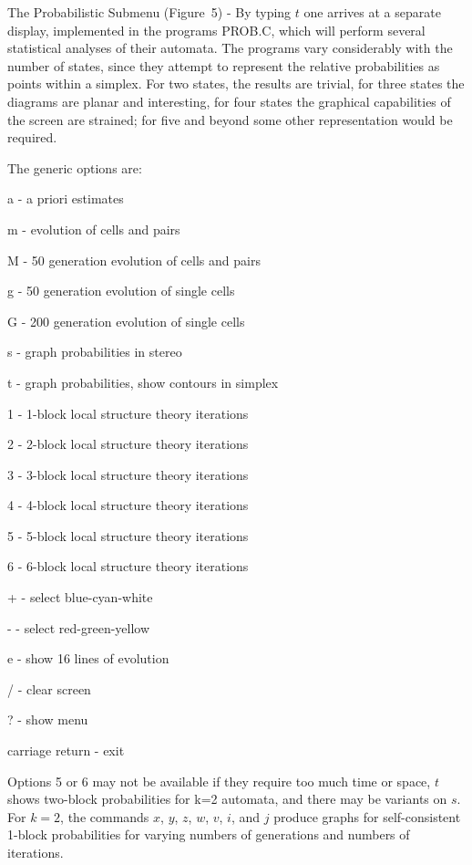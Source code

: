 \begin{list}{}{}
\item[The Probabilistic Submenu (Figure~5)] - By typing $t$ one arrives 
at a separate display, implemented in the programs PROB.C, which will 
perform several statistical analyses of their automata. The programs 
vary considerably with the number of states, since they attempt to 
represent the relative probabilities as points within a simplex. For 
two states, the results are trivial, for three states the diagrams are 
planar and interesting, for four states the graphical capabilities of 
the screen are strained; for five and beyond some other representation 
would be required. 

The generic options are: 

\begin{list}{}{}
\item[a] - a priori estimates 
\item[m] - evolution of cells and pairs 
\item[M] - 50 generation evolution of cells and pairs 
\item[g] - 50 generation evolution of single cells
\item[G] - 200 generation evolution of single cells
\item[s] - graph probabilities in stereo 
\item[t] - graph probabilities, show contours in simplex 
\item[1] - 1-block local structure theory iterations 
\item[2] - 2-block local structure theory iterations 
\item[3] - 3-block local structure theory iterations 
\item[4] - 4-block local structure theory iterations 
\item[5] - 5-block local structure theory iterations 
\item[6] - 6-block local structure theory iterations 
\item[+] - select blue-cyan-white
\item[-] - select red-green-yellow
\item[e] - show 16 lines of evolution 
\item[/] - clear screen
\item[?] - show menu
\item[carriage return] - exit 
\end{list} 

Options 5 or 6 may not be available if they require too much time or 
space, $t$ shows two-block probabilities for k=2 automata, and there may 
be variants on $s$. For $k=2$, the commands $x$, $y$, $z$, $w$, $v$, $i$, 
and $j$ produce graphs for self-consistent 1-block probabilities for 
varying numbers of generations and numbers of iterations. 


\end{list}
